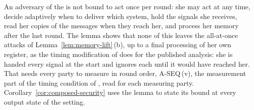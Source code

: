 
An adversary of the  is not bound to
act once per round: she may act at any time, decide adaptively when to deliver
which system, hold the signals she receives, read her copies of the messages
when they reach her, and process her memory after the last round. The lemma
shows that none of this leaves the all-at-once attacks of
Lemma~\ref{lem:memory-lift}\,(b), up to a final processing of her own register,
as the timing modification of \cite[Lemma~8.1]{tupkary2026decoy} does for the
published analysis: she is handed every signal at the start and ignores each
until it would have reached her. That needs every party to measure in round
order, A-SEQ\,(v), the measurement part of the timing condition of
\cite[Sec.~8.1.1, Protocol~2]{tupkary2026decoy}, read for each measuring
party. Corollary~\ref{cor:composed-security} uses the
lemma to state its bound at every output state of the setting.

